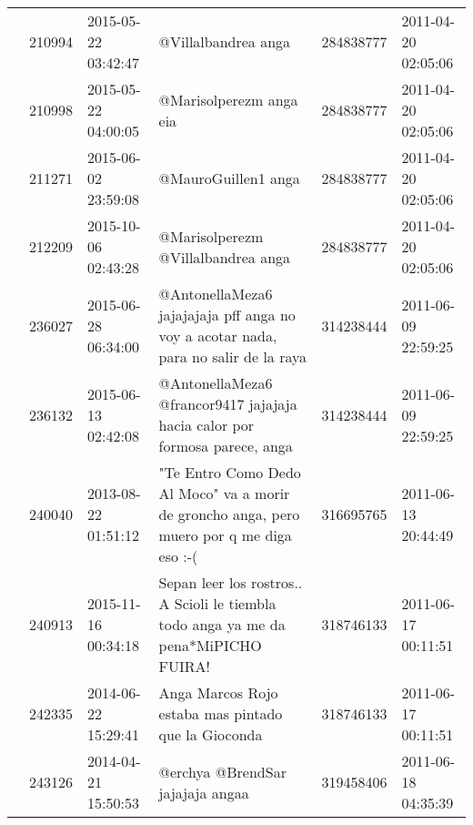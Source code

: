 \begin{tabular}{llllrl}
           & 210994  & 2015-05-22 03:42:47 &                                                                                                                          @Villalbandrea anga &   284838777 & 2011-04-20 02:05:06 \\
           & 210998  & 2015-05-22 04:00:05 &                                                                                                                      @Marisolperezm anga eia &   284838777 & 2011-04-20 02:05:06 \\
           & 211271  & 2015-06-02 23:59:08 &                                                                                                                          @MauroGuillen1 anga &   284838777 & 2011-04-20 02:05:06 \\
           & 212209  & 2015-10-06 02:43:28 &                                                                                                           @Marisolperezm @Villalbandrea anga &   284838777 & 2011-04-20 02:05:06 \\
           & 236027  & 2015-06-28 06:34:00 &                                                          @AntonellaMeza6 jajajajaja pff anga no voy a acotar nada,  para no salir de la raya &   314238444 & 2011-06-09 22:59:25 \\
           & 236132  & 2015-06-13 02:42:08 &                                                                   @AntonellaMeza6 @francor9417 jajajaja hacia calor por formosa parece, anga &   314238444 & 2011-06-09 22:59:25 \\
           & 240040  & 2013-08-22 01:51:12 &                                                    "Te Entro Como Dedo Al Moco" va a morir de groncho anga, pero muero por q me diga eso :-( &   316695765 & 2011-06-13 20:44:49 \\
           & 240913  & 2015-11-16 00:34:18 &                                                          Sepan leer los rostros.. A Scioli le tiembla todo anga ya me da pena*MiPICHO FUIRA! &   318746133 & 2011-06-17 00:11:51 \\
           & 242335  & 2014-06-22 15:29:41 &                                                                                          Anga Marcos Rojo estaba mas pintado que la Gioconda &   318746133 & 2011-06-17 00:11:51 \\
           & 243126  & 2014-04-21 15:50:53 &                                                                                                             @erchya @BrendSar jajajaja angaa &   319458406 & 2011-06-18 04:35:39 \\

\end{tabular}
